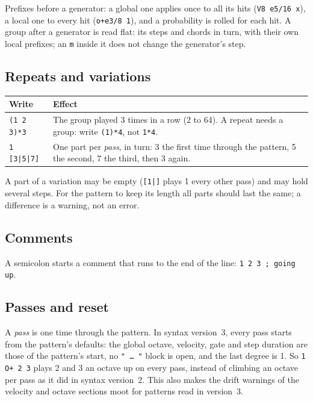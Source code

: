 \documentclass[11pt,a4paper]{article}
\newcommand{\pat}[1]{\texttt{#1}}
\begin{document}
Prefixes before a generator: a global one applies once to all its hits
(\pat{V8 e5/16 x}), a local one to every hit (\pat{o+e3/8 1}), and a
probability is rolled for each hit. A group after a generator is read flat: its
steps and chords in turn, with their own local prefixes; an \pat{m} inside it
does not change the generator's step.

\subsection{Repeats and variations}

\begin{center}
\begin{tabular}{@{}lp{85mm}@{}}
\toprule
\textbf{Write} & \textbf{Effect}\\
\midrule
\pat{(1 2 3)*3} & The group played 3 times in a row (2 to 64). A repeat needs
                  a group: write \pat{(1)*4}, not \pat{1*4}.\\
\pat{1 [3|5|7]} & One part per \emph{pass}, in turn: 3 the first time through the
                  pattern, 5 the second, 7 the third, then 3 again.\\
\bottomrule
\end{tabular}
\end{center}

A part of a variation may be empty (\pat{[1|]} plays 1 every other pass) and may
hold several steps. For the pattern to keep its length all parts should last the
same; a difference is a warning, not an error.

\subsection{Comments}

A semicolon starts a comment that runs to the end of the line:
\pat{1 2 3 ; going up}.

\subsection{Passes and reset}

A \emph{pass} is one time through the pattern. In syntax version~3, every pass
starts from the pattern's defaults: the global octave, velocity, gate and step
duration are those of the pattern's start, no \pat{" \ldots\ "} block is open,
and the last degree is 1. So \pat{1 O+ 2 3} plays 2 and 3 an octave up on every
pass, instead of climbing an octave per pass as it did in syntax version~2. This
also makes the drift warnings of the velocity and octave sections moot for
patterns read in version~3.
\end{document}
